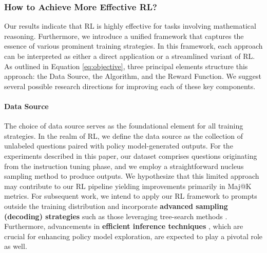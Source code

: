 \begin{itemize}[topsep=0pt]
\begin{itemize}[topsep=0pt]
\subsubsection{How to Achieve More Effective RL?}
\label{sec:effec_rl}
Our results indicate that RL is highly effective for tasks involving mathematical reasoning. Furthermore, we introduce a unified framework that captures the essence of various prominent training strategies. In this framework, each approach can be interpreted as either a direct application or a streamlined variant of RL. As outlined in Equation \ref{eq:objective}, three principal elements structure this approach: the Data Source, the Algorithm, and the Reward Function. We suggest several possible research directions for improving each of these key components.

\paragraph{Data Source} The choice of data source serves as the foundational element for all training strategies. In the realm of RL, we define the data source as the collection of unlabeled questions paired with policy model-generated outputs. For the experiments described in this paper, our dataset comprises questions originating from the instruction tuning phase, and we employ a straightforward nucleus sampling method to produce outputs. We hypothesize that this limited approach may contribute to our RL pipeline yielding improvements primarily in Maj@K metrics. For subsequent work, we intend to apply our RL framework to prompts outside the training distribution and incorporate \textbf{advanced sampling (decoding) strategies} such as those leveraging tree-search methods \citep{yao2023tree}. Furthermore, advancements in \textbf{efficient inference techniques} \citep{xia-etal-2023-speculative,leviathan2023fast,kwon2023efficient,xia2024unlocking}, which are crucial for enhancing policy model exploration, are expected to play a pivotal role as well.


\end{itemize}
\end{itemize}
